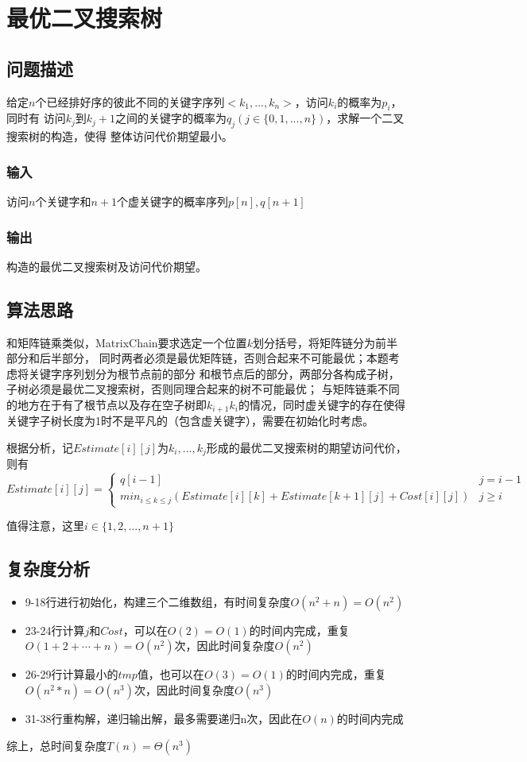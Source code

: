 \documentclass{ctexart}[UTF8]
\begin{document}
    \section{最优二叉搜索树}
    \subsection{问题描述}
    给定$n$个已经排好序的彼此不同的关键字序列$<k_1,...,k_n>$，访问$k_i$的概率为$p_i$，同时有
    访问$k_j$到$k_j+1$之间的关键字的概率为$q_j(j\in \{0,1,...,n\})$，求解一个二叉搜索树的构造，使得
    整体访问代价期望最小。
    \subsubsection{输入}
    访问$n$个关键字和$n+1$个虚关键字的概率序列$p[n],q[n+1]$
    \subsubsection{输出}
    构造的最优二叉搜索树及访问代价期望。
    \subsection{算法思路}
    和矩阵链乘类似，MatrixChain要求选定一个位置$k$划分括号，将矩阵链分为前半部分和后半部分，
    同时两者必须是最优矩阵链，否则合起来不可能最优；本题考虑将关键字序列划分为根节点前的部分
    和根节点后的部分，两部分各构成子树，子树必须是最优二叉搜索树，否则同理合起来的树不可能最优；
    与矩阵链乘不同的地方在于有了根节点以及存在空子树即$k_{i+1}k_i$的情况，同时虚关键字的存在使得
    关键字子树长度为1时不是平凡的（包含虚关键字），需要在初始化时考虑。\par 
    根据分析，记$Estimate[i][j]$为$k_i,...,k_j$形成的最优二叉搜索树的期望访问代价，则有\begin{equation}
        Estimate[i][j] = \begin{cases}
            q[i-1] & j = i-1\\
            min_{i\leq k\leq j}(Estimate[i][k] + Estimate[k+1][j] + Cost[i][j]) & j \ge i
        \end{cases}
    \end{equation}
    \par 值得注意，这里$i \in \{1,2,...,n+1\}$
    \subsection{复杂度分析}
    \begin{itemize}
        \item 9-18行进行初始化，构建三个二维数组，有时间复杂度$O(n^2 + n) = O(n^2)$
        \item 23-24行计算$j$和$Cost$，可以在$O(2) = O(1)$的时间内完成，重复$O(1+2+\cdots +n) = O(n^2)$次，因此时间复杂度$O(n^2)$
        \item 26-29行计算最小的$tmp$值，也可以在$O(3) = O(1)$的时间内完成，重复$O(n^2 * n) = O(n^3)$次，因此时间复杂度$O(n^3)$
        \item 31-38行重构解，递归输出解，最多需要递归n次，因此在$O(n)$的时间内完成
    \end{itemize}
    \par 综上，总时间复杂度$T(n) = \Theta(n^3)$
\end{document}
